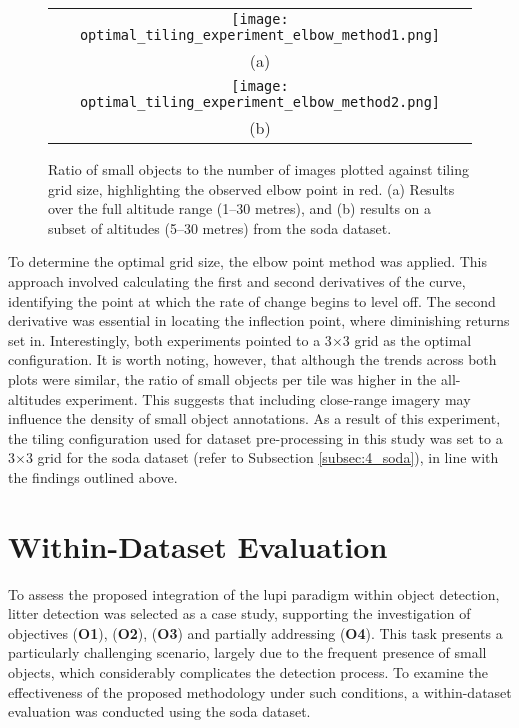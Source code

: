 \begin{figure}[!ht]
  \centering
  \begin{tabular}{c}
    \texttt{[image: optimal\_tiling\_experiment\_elbow\_method1.png]} \\
    \small (a) \\
    \addlinespace[1em]
    \texttt{[image: optimal\_tiling\_experiment\_elbow\_method2.png]} \\
    \small (b) \\
  \end{tabular}
  \caption{Ratio of small objects to the number of images plotted against tiling grid size, highlighting the observed elbow point in red. (a) Results over the full altitude range (1--30 metres), and (b) results on a subset of altitudes (5--30 metres) from the \gls{soda} dataset.}
  \label{fig:elbow_plot}
\end{figure}

To determine the optimal grid size, the elbow point \cite{elbow_point} method was applied. This approach involved calculating the first and second derivatives of the curve, identifying the point at which the rate of change begins to level off. The second derivative was essential in locating the inflection point, where diminishing returns set in.
Interestingly, both experiments pointed to a 3$\times$3 grid as the optimal configuration. It is worth noting, however, that although the trends across both plots were similar, the ratio of small objects per tile was higher in the all-altitudes experiment. This suggests that including close-range imagery may influence the density of small object annotations.
As a result of this experiment, the tiling configuration used for dataset pre-processing in this study was set to a 3$\times$3 grid for the \gls{soda} dataset (refer to Subsection \ref{subsec:4_soda}), in line with the findings outlined above.

\section{Within-Dataset Evaluation}
\label{sec:5_within_dataset_exp}


To assess the proposed integration of the \gls{lupi} paradigm within object detection, litter detection was selected as a case study, supporting the investigation of objectives (\textbf{O1}), (\textbf{O2}), (\textbf{O3}) and partially addressing (\textbf{O4}). This task presents a particularly challenging scenario, largely due to the frequent presence of small objects, which considerably complicates the detection process. To examine the effectiveness of the proposed methodology under such conditions, a within-dataset evaluation was conducted using the \gls{soda} dataset.

